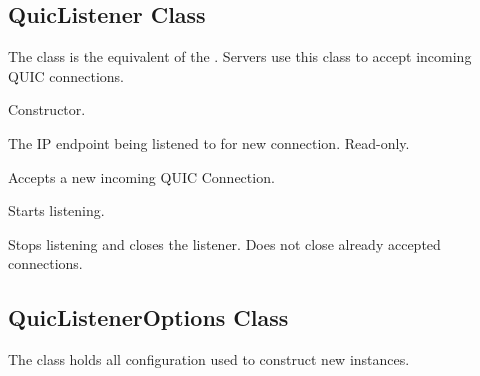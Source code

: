 \subsection{QuicListener Class}

The  class is the equivalent of the . Servers use this class
to accept incoming QUIC connections.

\begin{description}

     Constructor.

     The IP endpoint being listened to for new
connection. Read-only.

Accepts a new incoming QUIC Connection.

     Starts listening.

     Stops listening and closes the listener. Does not close
already accepted connections.

\end{description}

\subsection{QuicListenerOptions Class}

The  class holds all configuration used to construct new
 instances.

